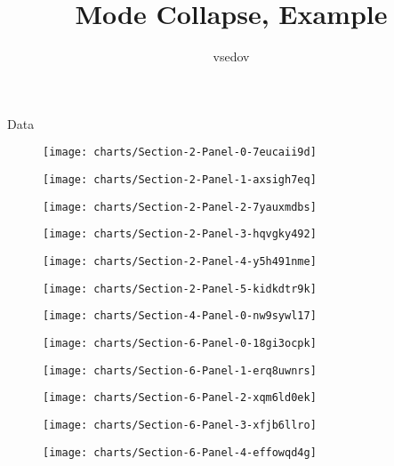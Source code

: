 \documentclass{article}
\title{Mode Collapse, Example }
\author{%
vsedov
}
\begin{document}
\maketitle

Data

\begin{figure}[!htb]
\texttt{[image: charts/Section-2-Panel-0-7eucaii9d]}
\caption{}
\endminipage\hfill
{}
\texttt{[image: charts/Section-2-Panel-1-axsigh7eq]}
\caption{}
\endminipage
\end{figure}

\begin{figure}[!htb]
\texttt{[image: charts/Section-2-Panel-2-7yauxmdbs]}
\caption{}
\endminipage\hfill
{}
\texttt{[image: charts/Section-2-Panel-3-hqvgky492]}
\caption{}
\endminipage
\end{figure}

\begin{figure}[!htb]
\texttt{[image: charts/Section-2-Panel-4-y5h491nme]}
\caption{}
\endminipage\hfill
{}
\texttt{[image: charts/Section-2-Panel-5-kidkdtr9k]}
\caption{}
\endminipage
\end{figure}

\begin{figure}[!htb]
\texttt{[image: charts/Section-4-Panel-0-nw9sywl17]}
\caption{}
\endminipage
\end{figure}

\begin{figure}[!htb]
\texttt{[image: charts/Section-6-Panel-0-18gi3ocpk]}
\caption{}
\endminipage\hfill
{}
\texttt{[image: charts/Section-6-Panel-1-erq8uwnrs]}
\caption{}
\endminipage
\end{figure}

\begin{figure}[!htb]
\texttt{[image: charts/Section-6-Panel-2-xqm6ld0ek]}
\caption{}
\endminipage\hfill
{}
\texttt{[image: charts/Section-6-Panel-3-xfjb6llro]}
\caption{}
\endminipage
\end{figure}

\begin{figure}[!htb]
\texttt{[image: charts/Section-6-Panel-4-effowqd4g]}
\caption{}
\endminipage
\end{figure}
\end{document}
